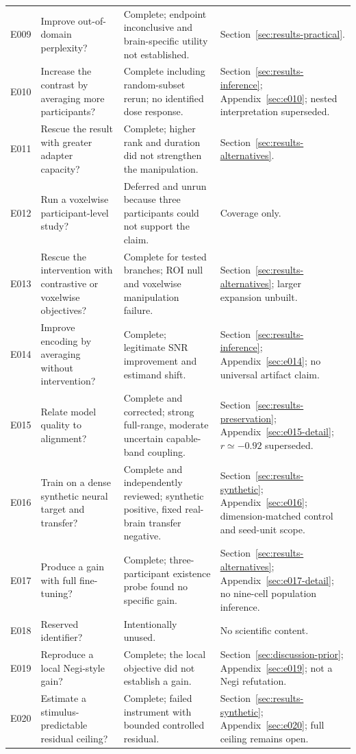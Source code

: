 \begin{longtable}{p{}p{}p{}p{}}
E009 & Improve out-of-domain perplexity? & Complete; endpoint inconclusive and brain-specific utility not established. & Section~\ref{sec:results-practical}. \\
E010 & Increase the contrast by averaging more participants? & Complete including random-subset rerun; no identified dose response. & Section~\ref{sec:results-inference}; Appendix~\ref{sec:e010}; nested interpretation superseded. \\
E011 & Rescue the result with greater adapter capacity? & Complete; higher rank and duration did not strengthen the manipulation. & Section~\ref{sec:results-alternatives}. \\
E012 & Run a voxelwise participant-level study? & Deferred and unrun because three participants could not support the claim. & Coverage only. \\
E013 & Rescue the intervention with contrastive or voxelwise objectives? & Complete for tested branches; ROI null and voxelwise manipulation failure. & Section~\ref{sec:results-alternatives}; larger expansion unbuilt. \\
E014 & Improve encoding by averaging without intervention? & Complete; legitimate SNR improvement and estimand shift. & Section~\ref{sec:results-inference}; Appendix~\ref{sec:e014}; no universal artifact claim. \\
E015 & Relate model quality to alignment? & Complete and corrected; strong full-range, moderate uncertain capable-band coupling. & Section~\ref{sec:results-preservation}; Appendix~\ref{sec:e015-detail}; $r\simeq-0.92$ superseded. \\
E016 & Train on a dense synthetic neural target and transfer? & Complete and independently reviewed; synthetic positive, fixed real-brain transfer negative. & Section~\ref{sec:results-synthetic}; Appendix~\ref{sec:e016}; dimension-matched control and seed-unit scope. \\
E017 & Produce a gain with full fine-tuning? & Complete; three-participant existence probe found no specific gain. & Section~\ref{sec:results-alternatives}; Appendix~\ref{sec:e017-detail}; no nine-cell population inference. \\
E018 & Reserved identifier? & Intentionally unused. & No scientific content. \\
E019 & Reproduce a local Negi-style gain? & Complete; the local objective did not establish a gain. & Section~\ref{sec:discussion-prior}; Appendix~\ref{sec:e019}; not a Negi refutation. \\
E020 & Estimate a stimulus-predictable residual ceiling? & Complete; failed instrument with bounded controlled residual. & Section~\ref{sec:results-synthetic}; Appendix~\ref{sec:e020}; full ceiling remains open. \\

\end{longtable}
